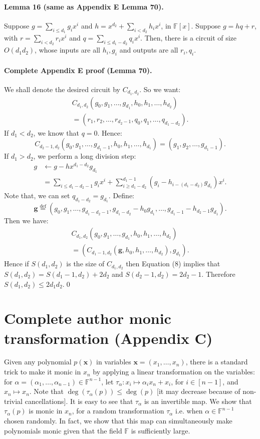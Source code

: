 \paragraph{Lemma 16 (same as Appendix E Lemma 70).} Suppose $g=\sum_{i\le d_1}g_ix^i$ and $h=x^{d_2}+\sum_{i<d_2}h_ix^i$, in $\mathbb F[x]$. Suppose $g=hq+r$, with $r=\sum_{i<d_2}r_ix^i$ and $q=\sum_{i\le d_1-d_2}q_ix^i$. Then, there is a circuit of size $O(d_1d_2)$, whose inputs are all $h_i,g_i$ and outputs are all $r_i,q_i$.
\paragraph{Complete Appendix E proof (Lemma 70).} We shall denote the desired circuit by $C_{d_1,d_2}$. So we want:
\begin{multline*}C_{d_1,d_2}(g_0,g_1,\ldots,g_{d_1},h_0,h_1,\ldots,h_{d_2})\\=(r_1,r_2,\ldots,r_{d_2-1},q_0,q_1,\ldots,q_{d_1-d_2}).\end{multline*}
If $d_1<d_2$, we know that $q=0$. Hence:
\[C_{d_2-1,d_2}(g_0,g_1,\ldots,g_{d_1-1},h_0,h_1,\ldots,h_{d_1})=(g_1,g_2,\ldots,g_{d_1-1}).\]
If $d_1>d_2$, we perform a long division step:
\begin{align*}g&\leftarrow g-hx^{d_1-d_2}g_{d_1}\\&=\sum_{i\le d_1-d_2-1}g_ix^i+\sum_{i\ge d_1-d_2}^{d_1-1}(g_i-h_{i-(d_1-d_2)}g_{d_1})x^i.\end{align*}
Note that, we can set $q_{d_1-d_2}=g_{d_1}$. Define:
\[\mathbf g\mathrel{\overset{\mathrm{def}}{=}}(g_0,g_1,\ldots,g_{d_1-d_2-1},g_{d_1-d_2}-h_0g_{d_1},\ldots,g_{d_1-1}-h_{d_2-1}g_{d_1}).\]
Then we have:
\begin{multline*}C_{d_1,d_2}(g_0,g_1,\ldots,g_{d_1},h_0,h_1,\ldots,h_{d_2})\\=(C_{d_1-1,d_2}(\mathbf g,h_0,h_1,\ldots,h_{d_2}),g_{d_1}).\tag{8}\end{multline*}
Hence if $S(d_1,d_2)$ is the size of $C_{d_1,d_2}$ then Equation (8) implies that $S(d_1,d_2)=S(d_1-1,d_2)+2d_2$ and $S(d_2-1,d_2)=2d_2-1$. Therefore $S(d_1,d_2)\le2d_1d_2$.\qed
\section*{Complete author monic transformation (Appendix C)}
Given any polynomial $p(\mathbf x)$ in variables $\mathbf x=(x_1,\ldots,x_n)$, there is a standard trick to make it monic in $x_n$ by applying a linear transformation on the variables: for $\alpha=(\alpha_1,\ldots,\alpha_{n-1})\in\mathbb F^{n-1}$, let $\tau_\alpha:x_i\mapsto\alpha_ix_n+x_i$, for $i\in[n-1]$, and $x_n\mapsto x_n$. Note that $\deg(\tau_\alpha(p))\le\deg(p)$ [it may decrease because of non-trivial cancellations]. It is easy to see that $\tau_\alpha$ is an invertible map. We show that $\tau_\alpha(p)$ is monic in $x_n$, for a random transformation $\tau_\alpha$ i.e. when $\alpha\in\mathbb F^{n-1}$ chosen randomly. In fact, we show that this map can simultaneously make polynomials monic given that the field $\mathbb F$ is sufficiently large.
